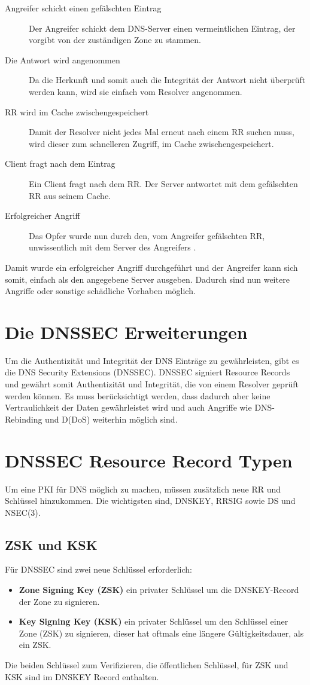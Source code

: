 \begin{description}
    \item[Angreifer schickt einen gefälschten Eintrag] Der Angreifer schickt dem DNS-Server einen vermeintlichen Eintrag, der vorgibt von der zuständigen Zone zu stammen.
    \item[Die Antwort wird angenommen] Da die Herkunft und somit auch die Integrität der Antwort nicht überprüft werden kann, wird sie einfach vom Resolver angenommen.
    \item[RR wird im Cache zwischengespeichert] Damit der Resolver nicht jedes Mal erneut nach einem RR suchen muss, wird dieser zum schnelleren Zugriff, im Cache zwischengespeichert.
    \item[Client fragt nach dem Eintrag] Ein Client fragt nach dem RR. Der Server antwortet mit dem gefälschten RR aus seinem Cache.
    \item[Erfolgreicher Angriff] Das Opfer wurde nun durch den, vom Angreifer gefälschten RR, unwissentlich mit dem Server des Angreifers \cite{asudbringUebersichtUeberDNSSEC}.
\end{description}
Damit wurde ein erfolgreicher Angriff durchgeführt und der Angreifer kann sich somit, einfach als den angegebene Server ausgeben.
Dadurch sind nun weitere Angriffe oder sonstige schädliche Vorhaben möglich.


\section{Die DNSSEC Erweiterungen}
Um die Authentizität und Integrität der DNS Einträge zu gewährleisten, gibt es die DNS Security Extensions (DNSSEC).
DNSSEC signiert Resource Records und gewährt somit Authentizität und Integrität, die von einem Resolver geprüft werden können.
Es muss berücksichtigt werden, dass dadurch aber keine Vertraulichkeit der Daten gewährleistet wird und auch Angriffe wie DNS-Rebinding und D(DoS) weiterhin möglich sind.


\section{DNSSEC Resource Record Typen}
Um eine PKI für DNS möglich zu machen, müssen zusätzlich neue RR und Schlüssel hinzukommen.
Die wichtigsten sind, DNSKEY, RRSIG sowie DS und NSEC(3).

\subsection{ZSK und KSK}
Für DNSSEC sind zwei neue Schlüssel erforderlich:
\begin{itemize}
    \item \textbf{Zone Signing Key (ZSK)} ein privater Schlüssel um die DNSKEY-Record der Zone zu signieren.
    \item \textbf{Key Signing Key (KSK)} ein privater Schlüssel um den Schlüssel einer Zone (ZSK) zu signieren, dieser hat oftmals eine längere Gültigkeitsdauer, als ein ZSK.
\end{itemize}
Die beiden Schlüssel zum Verifizieren, die öffentlichen Schlüssel, für ZSK und KSK sind im DNSKEY Record enthalten.

